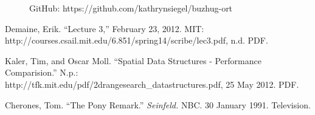 \documentclass[11pt, oneside]{article}
\begin{document}
\begin{figure}[b]
    GitHub: https://github.com/kathrynsiegel/buzhug-ort
\end{figure}

\newpage

\begin{thebibliography}{1}
    
     Demaine, Erik. ``Lecture 3,'' February 23, 2012.  MIT: \\
        http://courses.csail.mit.edu/6.851/spring14/scribe/lec3.pdf, n.d. PDF.

     Kaler, Tim, and Oscar Moll. ``Spatial Data Structures -
        Performance Comparision.'' N.p.: \\
        http://tfk.mit.edu/pdf/2drangesearch\_datastructures.pdf, 25 May 2012.
        PDF.

     Cherones, Tom. ``The Pony Remark.'' \textit{Seinfeld.}
        NBC. 30 January 1991. Television.

\end{thebibliography}
\end{document}
